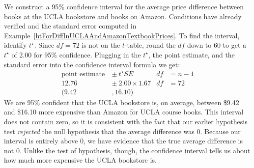 We construct a 95\% confidence interval for the average price difference between books at the UCLA bookstore and books on Amazon. Conditions have already verified and the standard error computed in Example~\ref{htForDiffInUCLAAndAmazonTextbookPrices}. To find the interval, identify $t
^{\star}$. Since $df = 72$ is not on the $t$-table, round the $df$ down to 60 to get a $t^{\star}$ of 2.00  for 95\% confidence. Plugging in the $t^{\star}$, the point estimate, and the standard error into the confidence interval formula we get:
\begin{align*}
\text{point estimate} \ &\pm\ t^{\star}SE
	&df&=n-1\\
12.76 \ &\pm\ 2.00\times 1.67
	&df&=72\\
(9.42 &, 16.10)
\end{align*}
We are 95\% confident that the UCLA bookstore is, on average, between \$9.42 and \$16.10 more expensive than Amazon for UCLA course books. This interval does not contain zero, so it is consistent with the fact that our earlier hypothesis test \emph{rejected} the null hypothesis that the average difference was 0. Because our interval is entirely above 0, we have evidence that the true average difference is not 0. Unlike the test of hypothesis, though, the confidence interval tells us about how much more expensive the UCLA bookstore is.


